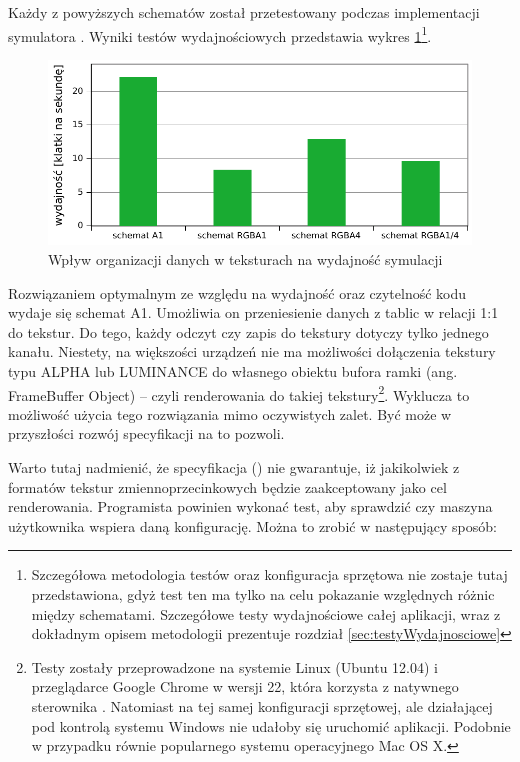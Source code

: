 Każdy z powyższych schematów został przetestowany podczas implementacji
symulatora . Wyniki testów wydajnościowych przedstawia wykres
\ref{fig:texPerf}\footnote{Szczegółowa metodologia testów oraz konfiguracja
sprzętowa nie zostaje tutaj przedstawiona, gdyż test ten ma tylko na celu
pokazanie względnych różnic między schematami. Szczegółowe testy
wydajnościowe całej aplikacji, wraz z dokładnym opisem metodologii prezentuje
rozdział \ref{sec:testyWydajnosciowe}}.

\begin{figure}[!h]
\centering
\includegraphics[width=.9\textwidth]{img/texPerf}
\caption{Wpływ organizacji danych w teksturach na wydajność symulacji 
}
\label{fig:texPerf}
\end{figure}

Rozwiązaniem optymalnym ze względu na wydajność oraz czytelność kodu wydaje się
schemat A1. Umożliwia on przeniesienie danych z tablic w relacji 1:1 do tekstur.
Do tego, każdy odczyt czy zapis do tekstury dotyczy tylko jednego kanału.
Niestety, na większości urządzeń nie ma możliwości dołączenia tekstury typu
ALPHA lub LUMINANCE do własnego obiektu bufora ramki (ang. FrameBuffer Object)
-- czyli renderowania do takiej tekstury\footnote{Testy zostały przeprowadzone
na systemie Linux (Ubuntu 12.04) i przeglądarce Google Chrome w wersji 22, która
korzysta z natywnego sterownika . Natomiast na tej samej konfiguracji
sprzętowej, ale działającej pod kontrolą systemu Windows nie udałoby się
uruchomić aplikacji. Podobnie w przypadku równie popularnego systemu
operacyjnego Mac OS X.}. Wyklucza to możliwość użycia tego rozwiązania mimo
oczywistych zalet. Być może w przyszłości rozwój specyfikacji  na to
pozwoli.

Warto tutaj nadmienić, że specyfikacja  (\cite{WebGLSpec}) nie
gwarantuje, iż jakikolwiek z formatów tekstur zmiennoprzecinkowych będzie
zaakceptowany jako cel renderowania. Programista powinien wykonać test, aby
sprawdzić czy maszyna użytkownika wspiera daną konfigurację. Można to zrobić w
następujący sposób:

